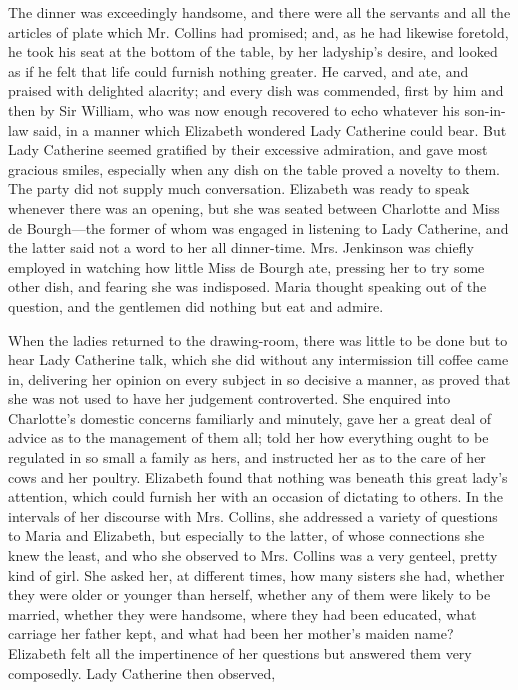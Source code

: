 The dinner was exceedingly handsome, and there were all the servants and all the articles of plate which Mr. Collins had promised; and, as he had likewise foretold, he took his seat at the bottom of the table, by her ladyship's desire, and looked as if he felt that life could furnish nothing greater. He carved, and ate, and praised with delighted alacrity; and every dish was commended, first by him and then by Sir William, who was now enough recovered to echo whatever his son-in-law said, in a manner which Elizabeth wondered Lady Catherine could bear. But Lady Catherine seemed gratified by their excessive admiration, and gave most gracious smiles, especially when any dish on the table proved a novelty to them. The party did not supply much conversation. Elizabeth was ready to speak whenever there was an opening, but she was seated between Charlotte and Miss de Bourgh---the former of whom was engaged in listening to Lady Catherine, and the latter said not a word to her all dinner-time. Mrs. Jenkinson was chiefly employed in watching how little Miss de Bourgh ate, pressing her to try some other dish, and fearing she was indisposed. Maria thought speaking out of the question, and the gentlemen did nothing but eat and admire.

When the ladies returned to the drawing-room, there was little to be done but to hear Lady Catherine talk, which she did without any intermission till coffee came in, delivering her opinion on every subject in so decisive a manner, as proved that she was not used to have her judgement controverted. She enquired into Charlotte's domestic concerns familiarly and minutely, gave her a great deal of advice as to the management of them all; told her how everything ought to be regulated in so small a family as hers, and instructed her as to the care of her cows and her poultry. Elizabeth found that nothing was beneath this great lady's attention, which could furnish her with an occasion of dictating to others. In the intervals of her discourse with Mrs. Collins, she addressed a variety of questions to Maria and Elizabeth, but especially to the latter, of whose connections she knew the least, and who she observed to Mrs. Collins was a very genteel, pretty kind of girl. She asked her, at different times, how many sisters she had, whether they were older or younger than herself, whether any of them were likely to be married, whether they were handsome, where they had been educated, what carriage her father kept, and what had been her mother's maiden name? Elizabeth felt all the impertinence of her questions but answered them very composedly. Lady Catherine then observed,

